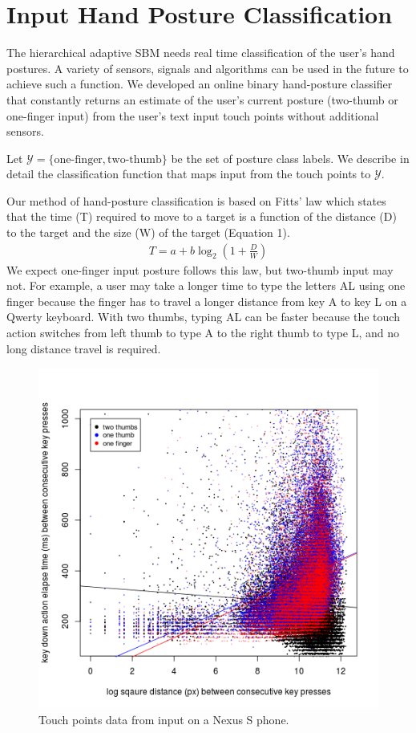 \documentclass{sigchi}
\begin{document}
\section{Input Hand Posture Classification}\label{sec:posture-classification}
The hierarchical adaptive SBM needs real time classification of the user’s hand postures. A variety of sensors, signals and algorithms can be used in the future to achieve such a function. We developed an online binary hand-posture classifier 
that constantly returns an estimate of the user's current posture (two-thumb or one-finger input) from the user’s text input touch points without additional sensors. 

Let $\mathcal{Y} = \{\text{one-finger}, \text{two-thumb}\}$ be the set of posture
class labels. We describe in detail the classification function that maps input from the
touch points to $\mathcal{Y}$.

Our method of hand-posture classification is based on Fitts’ law which states that the time (T) required to move to a target is a function of the distance (D) to the target and the size (W) of the target (Equation 1).
\begin{align}
T = a + b\log_2(1 + \frac{D}{W})
\end{align}                                                  
We expect one-finger input posture follows this law,  but two-thumb input may not. For example, a user may take a longer time to type the letters AL using one finger because the finger has to travel a longer distance from key A to key L on a Qwerty keyboard. With two thumbs, typing AL can be faster because the touch action switches from left thumb to type A to the right thumb to type L, and no long distance travel is required.

\begin{figure}[tb]
  \centering
  \includegraphics[width=0.9\columnwidth]{figures/time-distance.png}
  \caption{Touch points data from input on a Nexus S phone.}
  \label{fig:time-distance}
\end{figure}
\end{document}
